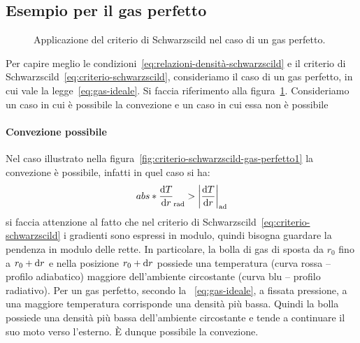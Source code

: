 \subsection{Esempio per il gas perfetto}
\begin{figure}
\centering
{} \qquad
{} 
\caption{Applicazione del criterio di Schwarzscild nel caso di un gas perfetto.}
\label{fig:criterio-schwarzscild-gas-perfetto}
\end{figure}

Per capire meglio le condizioni~\eqref{eq:relazioni-densità-schwarzscild} e il criterio di Schwarzscild~\eqref{eq:criterio-schwarzscild}, consideriamo il caso di un gas perfetto, in cui vale la legge~\eqref{eq:gas-ideale}. Si faccia riferimento alla figura~\ref{fig:criterio-schwarzscild-gas-perfetto}. Consideriamo un caso in cui è possibile la convezione e un caso in cui essa non è possibile

\paragraph{Convezione possibile}
Nel caso illustrato nella figura~\ref{fig:criterio-schwarzscild-gas-perfetto1} la convezione è possibile, infatti in quel caso si ha:
\[
abs*{\dfrac{\ud T}{\ud r}}_\textup{rad} > \abs*{\dfrac{\ud T}{\ud r}}_\textup{ad}
\]
si faccia attenzione al fatto che nel criterio di Schwarzscild~\eqref{eq:criterio-schwarzscild} i gradienti sono espressi in modulo, quindi bisogna guardare la pendenza in modulo delle rette. In particolare, la bolla di gas di sposta da $r_0$ fino a $r_0 + \ud r$ e nella posizione $r_0 + \ud r$ possiede una temperatura (curva rossa -- profilo adiabatico) maggiore dell'ambiente circostante (curva blu -- profilo radiativo). Per un gas perfetto, secondo la ~\eqref{eq:gas-ideale}, a fissata pressione, a una maggiore temperatura corrisponde una densità più bassa. Quindi la bolla possiede una densità più bassa dell'ambiente circostante e tende a continuare il suo moto verso l'esterno. È dunque possibile la convezione.

